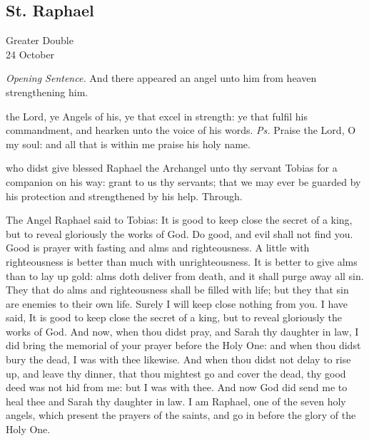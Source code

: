 \subsection{St. Raphael}
\begin{inhead}
	{Greater Double\\
		24 October}
\end{inhead}
\par\noindent
\textit{Opening Sentence.} And there appeared an angel unto him from heaven strengthening him.

\introit
{} the Lord, ye Angels of his, ye that excel in strength: ye that fulfil his commandment, and hearken unto the voice of his words. \textit{Ps.} Praise the Lord, O my soul: and all that is within me praise his holy name.

\collect
{} who didst give blessed Raphael the Archangel unto thy servant Tobias for a companion on his way: grant to us thy servants; that we may ever be guarded by his protection and strengthened by his help. Through.

 The Angel Raphael said to Tobias: It is good to keep close the secret of a king, but to reveal gloriously the works of God. Do good, and evil shall not find you. Good is prayer with fasting and alms and righteousness. A little with righteousness is better than much with unrighteousness. It is better to give alms than to lay up gold: alms doth deliver from death, and it shall purge away all sin. They that do alms and righteousness shall be filled with life; but they that sin are enemies to their own life. Surely I will keep close nothing from you. I have said, It is good to keep close the secret of a king, but to reveal gloriously the works of God. And now, when thou didst pray, and Sarah thy daughter in law, I did bring the memorial of your prayer before the Holy One: and when thou didst bury the dead, I was with thee likewise.  And when thou didst not delay to rise up, and leave thy dinner, that thou mightest go and cover the dead, thy good deed was not hid from me: but I was with thee. And now God did send me to heal thee and Sarah thy daughter in law. I am Raphael, one of the seven holy angels, which present the prayers of the saints, and go in before the glory of the Holy One. 


